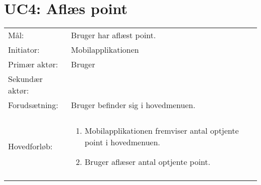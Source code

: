 \newpage

\section{UC4: Aflæs point}
\begin{tabular}{ >{\raggedleft} p{3cm} | p{12cm} }
Mål: & Bruger har aflæst point. \\
Initiator: & Mobilapplikationen \\
Primær aktør: & Bruger \\
Sekundær aktør: &  \\
Forudsætning: & Bruger befinder sig i hovedmenuen.
 \\
 & \\
Hovedforløb:  & \begin{enumerate}[label=\arabic*.),itemjoin={\newline},topsep=0pt,partopsep=0pt,itemsep=0pt,leftmargin=*]   
\item Mobilapplikationen fremviser antal optjente point i hovedmenuen.
\item Bruger aflæser antal optjente point.
\end{enumerate}\\
& \\
\end{tabular}



